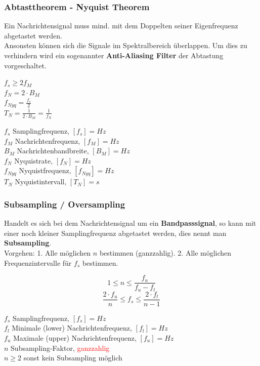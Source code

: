 \subsubsection{Abtasttheorem - Nyquist Theorem}
Ein Nachrichtensignal muss mind. mit dem Doppelten seiner Eigenfrequenz abgetastet werden. \\
Ansonsten können sich die Signale im Spektralbereich überlappen.  Um dies zu verhindern wird ein
sogenannter \textbf{Anti-Aliasing Filter} der Abtastung vorgeschaltet.\\
\begin{minipage}[t][2.7cm][c]{8cm}
$ f_s \geq 2 f_M $ \\
$ f_N = 2 \cdot B_M $ \\
$ f_{Nyq} = \frac{f_s}{2}$ \\
$ T_N = \frac{1}{2\cdot B_M} = \frac{1}{f_N} $

\end{minipage}
\begin{minipage}[t][2.7cm][c]{10cm}
	$f_s$ Samplingfrequenz, $[f_s] = Hz$ \\
	$f_M$ Nachrichtenfrequenz, $[f_M] = Hz$ \\
	$B_M$ Nachrichtenbandbreite, $[B_M] = Hz$ \\
	$f_N$ Nyquistrate, $[f_N] = Hz$ \\
	$f_{Nyq}$ Nyquistfrequenz, $[f_{Nyq}] = Hz$ \\
	$T_N$ Nyquistintervall, $[T_N] = s$ \\	
\end{minipage}

\subsubsection{Subsampling / Oversampling}
Handelt es sich bei dem Nachrichtensignal um ein \textbf{Bandpasssignal}, so kann mit einer noch
kleiner Samplingfrequenz abgetastet werden, dies nennt man \textbf{Subsampling}. \\
Vorgehen: 1. Alle möglichen $n$ bestimmen (ganzzahlig). 2. Alle möglichen Frequenzintervalle für
$f_s$ bestimmen.

\begin{minipage}[t][2cm][c]{10cm}
$$ 1 \leq n \leq \frac{f_u}{f_u - f_l} $$
$$ \frac{2 \cdot f_u}{n} \leq f_s \leq \frac{2 \cdot f_l}{n-1}$$
\end{minipage}
\begin{minipage}[t][2cm][c]{8cm}
	$f_s$ Samplingfrequenz, $[f_s] = Hz$ \\
	$f_l$ Minimale (lower) Nachrichtenfrequenz, $[f_l] = Hz$ \\
	$f_u$ Maximale (upper) Nachrichtenfrequenz, $[f_u] = Hz$ \\
	$n$ Subsampling-Faktor, \textcolor{red}{ganzzahlig} \\
	$n \geq 2$ sonst kein Subsampling möglich
\end{minipage}

